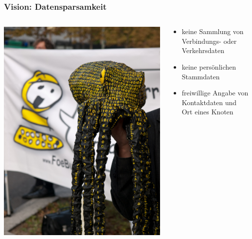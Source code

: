 \documentclass[10pt,handout]{beamer}
\begin{document}
\begin{frame}
	\frametitle{Vision: Datensparsamkeit}
		\begin{columns}[c]
			\begin{column}{5cm}
				\includegraphics[width=\textwidth]{images/krake}
			\end{column}
			\begin{column}{7cm}
				\begin{itemize}[<+->]
					\item keine Sammlung von Verbindungs- oder Verkehrsdaten
					\item keine persönlichen Stammdaten
					\item freiwillige Angabe von Kontaktdaten und Ort eines Knoten
				\end{itemize}
			\end{column}
		\end{columns}
\end{frame}
\end{document}
